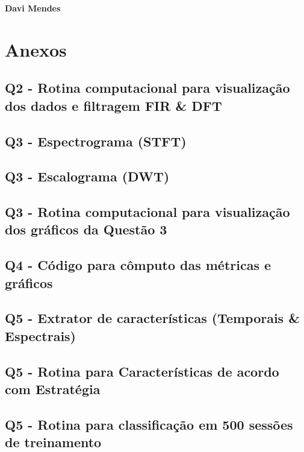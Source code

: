 \documentclass{article}
\begin{document}
\textbf{Davi Mendes}

\newpage
\section*{Anexos}

\subsection*{Q2 - Rotina computacional para visualização dos dados e filtragem FIR \& DFT}


\subsection*{Q3 - Espectrograma (STFT)}


\subsection*{Q3 - Escalograma (DWT)}


\subsection*{Q3 - Rotina computacional para visualização dos gráficos da Questão 3}


\subsection*{Q4 - Código para cômputo das métricas e gráficos}


\subsection*{Q5 - Extrator de características (Temporais \& Espectrais)}


\subsection*{Q5 - Rotina para Características de acordo com Estratégia}


\subsection*{Q5 - Rotina para classificação em 500 sessões de treinamento}



\end{document}
